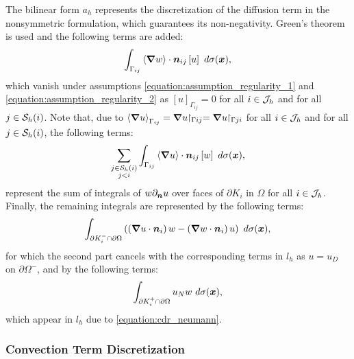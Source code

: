 The bilinear form $a_h$ represents the discretization of the diffusion term in the nonsymmetric formulation, which guarantees its non-negativity. Green's theorem is used and the following terms are added:
\begin{align}
    \int_{\Gamma_{ij}} \left\langle \bm{\nabla} w \right\rangle \cdot \bm{n}_{ij} \left[ u \right] ~ d \sigma(\bm{x}),
\end{align}
which vanish under assumptions \cref{equation:assumption_regularity_1} and \cref{equation:assumption_regularity_2} as $\left[ u \right]_{\Gamma_{ij}} = 0$ for all $i \in \mathcal{J}_h$ and for all $j \in \mathcal{S}_h(i)$. Note that, due to $\left\langle \bm{\nabla} u \right\rangle_{\Gamma_{ij}} = \bm{\nabla} u \!\!\restriction_{\Gamma{ij}} = \bm{\nabla} u \!\!\restriction_{\Gamma{ji}}$ for all $i \in \mathcal{J}_h$ and for all $j \in \mathcal{S}_h(i)$, the following terms:
\begin{align}
    \sum_{\substack{j \in \mathcal{S}_h(i) \\ j < i}} \int_{\Gamma_{ij}} \left\langle \bm{\nabla} u \right\rangle \cdot \bm{n}_{ij} \left[ w \right] ~ d \sigma(\bm{x}),
\end{align}
represent the sum of integrals of $w \partial_{\bm{n}} u$ over faces of $\partial K_i$ in $\Omega$ for all $i \in \mathcal{J}_h$. Finally, the remaining integrals are represented by the following terms:
\begin{align}
    \int_{\partial K_i^- \cap \partial \Omega} \left( \left( \bm{\nabla} u \cdot \bm{n}_i \right) w - \left( \bm{\nabla} w \cdot \bm{n}_i \right) u \right) ~ d \sigma(\bm{x}),
\end{align}
for which the second part cancels with the corresponding terms in $l_h$ as $u = u_D$ on $\partial \Omega^-$, and by the following terms:
\begin{align}
    \int_{\partial K_i^+ \cap \partial \Omega} u_N w ~ d \sigma(\bm{x}),
\end{align}
which appear in $l_h$ due to \cref{equation:cdr_neumann}.

\newpage
\subsubsection{Convection Term Discretization}

